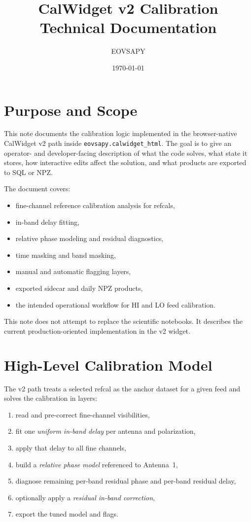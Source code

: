\documentclass[11pt]{article}
\title{CalWidget v2 Calibration Technical Documentation}
\author{EOVSAPY}
\date{\today}
\begin{document}
\maketitle

\tableofcontents

\section{Purpose and Scope}

This note documents the calibration logic implemented in the browser-native
CalWidget v2 path inside \texttt{eovsapy.calwidget\_html}. The goal is to give
an operator- and developer-facing description of what the code solves, what
state it stores, how interactive edits affect the solution, and what products
are exported to SQL or NPZ.

The document covers:
\begin{itemize}[leftmargin=1.5em]
  \item fine-channel reference calibration analysis for refcals,
  \item in-band delay fitting,
  \item relative phase modeling and residual diagnostics,
  \item time masking and band masking,
  \item manual and automatic flagging layers,
  \item exported sidecar and daily NPZ products,
  \item the intended operational workflow for HI and LO feed calibration.
\end{itemize}

This note does not attempt to replace the scientific notebooks. It describes the
current production-oriented implementation in the v2 widget.

\section{High-Level Calibration Model}

The v2 path treats a selected refcal as the anchor dataset for a given feed and
solves the calibration in layers:
\begin{enumerate}[leftmargin=1.5em]
  \item read and pre-correct fine-channel visibilities,
  \item fit one \emph{uniform in-band delay} per antenna and polarization,
  \item apply that delay to all fine channels,
  \item build a \emph{relative phase model} referenced to Antenna~1,
  \item diagnose remaining per-band residual phase and per-band residual delay,
  \item optionally apply a \emph{residual in-band correction},
  \item export the tuned model and flags.
\end{enumerate}
\end{document}
